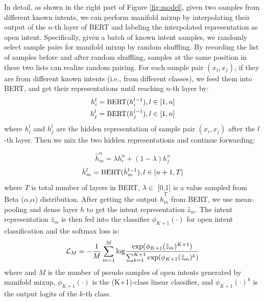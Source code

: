 \documentclass[journal]{IEEEtran}
\begin{document}
In detail, as shown in the right part of Figure \ref{fig:model}, given two samples from different known intents, we can perform manifold mixup by interpolating their output of the $n$-th layer of BERT and labeling the interpolated representation as open intent.
Specifically, given a batch of known intent samples, we randomly select sample pairs for manifold mixup by random shuffling.
By recording the list of samples before and after random shuffling, samples at the same position in these two lists can realize random pairing.
For each sample pair $(x_i,x_j)$, if they are from different known intents (i.e., from different classes), we feed them into BERT, and get their representations until reaching $n$-th layer by:
\begin{equation}
\begin{aligned}
    h_i^l = {\rm BERT}(h_{i}^{l-1}), l\in[1,n]\\
    h_j^l = {\rm BERT}(h_{j}^{l-1}), l\in[1,n]
\end{aligned}
\end{equation}
where $h_i^l$ and $h_j^l$ are the hidden representation of sample pair $(x_i,x_j)$ after the $l$-th layer.
Then we mix the two hidden representations and continue forwarding:

\begin{equation}
    \hat{h}_m^n = \lambda h_i^n + (1-\lambda)h_j^n
\end{equation}
\begin{equation}
    \hat{h}_m^l = {\rm BERT}(\hat{h}_m^{l-1}), l\in[n+1,T]
\end{equation}
where $T$ is total number of layers in BERT, $\lambda \in$ [0,1] is a value sampled from Beta ($\alpha$,$\alpha$) distribution.
After getting the output $\hat{h}_m^T$ from BERT, we use mean-pooling and dense layer $h$ to get the intent representation $\hat{z}_m$.
The intent representation $\hat{z}_m$ is then fed into the classifier $\phi_{K+1}(\cdot)$ for open intent classification and the softmax loss is:
\begin{equation}
    \mathcal{L}_M = -\frac{1}{M} \sum_{m=1}^M {\rm log} \frac{{\rm exp}(\phi_{K+1}(\hat{z}_m)^{K+1})}{\sum_{k=1}^{K+1} {\rm exp}(\phi_{K+1}(\hat{z}_m)^k)}
\end{equation}
where and $M$ is the number of pseudo samples of open intents generated by manifold mixup, $\phi_{K+1}(\cdot)$ is the (K+1)-class linear classifier, and $\phi_{K+1}(\cdot)^k$ is the output logits of the $k$-th class.
\end{document}
